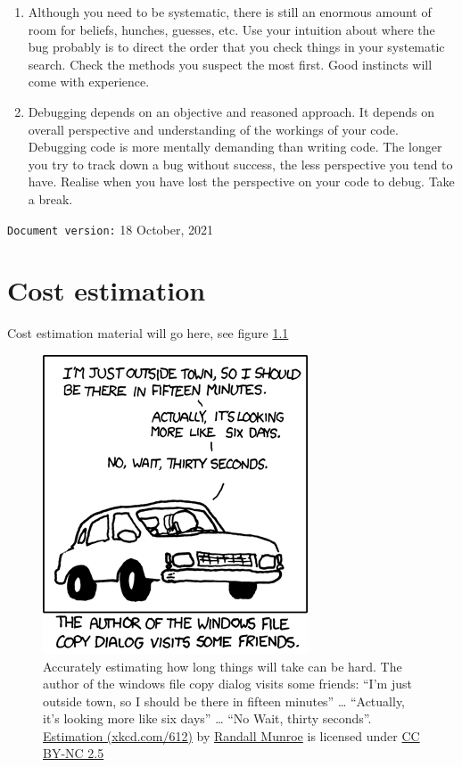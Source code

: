 \documentclass[
]{book}
\begin{document}
\begin{enumerate}
\item
  Although you need to be systematic, there is still an enormous amount of room for beliefs, hunches, guesses, etc. Use your intuition about where the bug probably is to direct the order that you check things in your systematic search. Check the methods you suspect the most first. Good instincts will come with experience.
\item
  Debugging depends on an objective and reasoned approach. It depends on overall perspective and understanding of the workings of your code. Debugging code is more mentally demanding than writing code. The longer you try to track down a bug without success, the less perspective you tend to have. Realise when you have lost the perspective on your code to debug. Take a break.
\end{enumerate}

\texttt{Document\ version:} 18 October, 2021

\hypertarget{estimating}{%
\chapter{Cost estimation}\label{estimating}}

Cost estimation material will go here, see figure \ref{fig:xkcd-estimation-fig}

\begin{figure}

{\centering \includegraphics[width=0.75\linewidth]{images/xkcd-estimation} 

}

\caption{Accurately estimating how long things will take can be hard. The author of the windows file copy dialog visits some friends: ``I'm just outside town, so I should be there in fifteen minutes'' \ldots{} ``Actually, it's looking more like six days'' \ldots{} ``No Wait, thirty seconds''. \href{https://xkcd.com/612/}{Estimation (xkcd.com/612)} by \href{https://en.wikipedia.org/wiki/Randall_Munroe}{Randall Munroe} is licensed under \href{https://creativecommons.org/licenses/by-nc/2.5/}{CC BY-NC 2.5}}\label{fig:xkcd-estimation-fig}
\end{figure}
\end{document}
